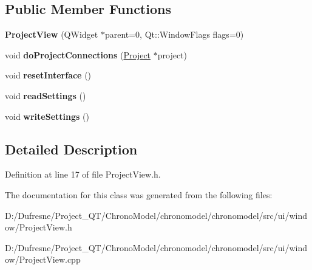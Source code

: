 \subsection*{Public Member Functions}
\begin{DoxyCompactItemize}
\item 
\hypertarget{class_project_view_a150849baf6bb288b773dafb44eb4e06a}{{\bfseries Project\-View} (Q\-Widget $\ast$parent=0, Qt\-::\-Window\-Flags flags=0)}\label{class_project_view_a150849baf6bb288b773dafb44eb4e06a}

\item 
\hypertarget{class_project_view_a9c3874eb5377936d41e689cef578ff99}{void {\bfseries do\-Project\-Connections} (\hyperlink{class_project}{Project} $\ast$project)}\label{class_project_view_a9c3874eb5377936d41e689cef578ff99}

\item 
\hypertarget{class_project_view_a161d658466cdd955fe2aec61bf04d345}{void {\bfseries reset\-Interface} ()}\label{class_project_view_a161d658466cdd955fe2aec61bf04d345}

\item 
\hypertarget{class_project_view_a697f820761c9e5dce0583027245170ad}{void {\bfseries read\-Settings} ()}\label{class_project_view_a697f820761c9e5dce0583027245170ad}

\item 
\hypertarget{class_project_view_ab67756d264f8e2c3d487a6c743d089b9}{void {\bfseries write\-Settings} ()}\label{class_project_view_ab67756d264f8e2c3d487a6c743d089b9}

\end{DoxyCompactItemize}


\subsection{Detailed Description}


Definition at line 17 of file Project\-View.\-h.



The documentation for this class was generated from the following files\-:\begin{DoxyCompactItemize}
\item 
D\-:/\-Dufresne/\-Project\-\_\-\-Q\-T/\-Chrono\-Model/chronomodel/chronomodel/src/ui/window/Project\-View.\-h\item 
D\-:/\-Dufresne/\-Project\-\_\-\-Q\-T/\-Chrono\-Model/chronomodel/chronomodel/src/ui/window/Project\-View.\-cpp\end{DoxyCompactItemize}
